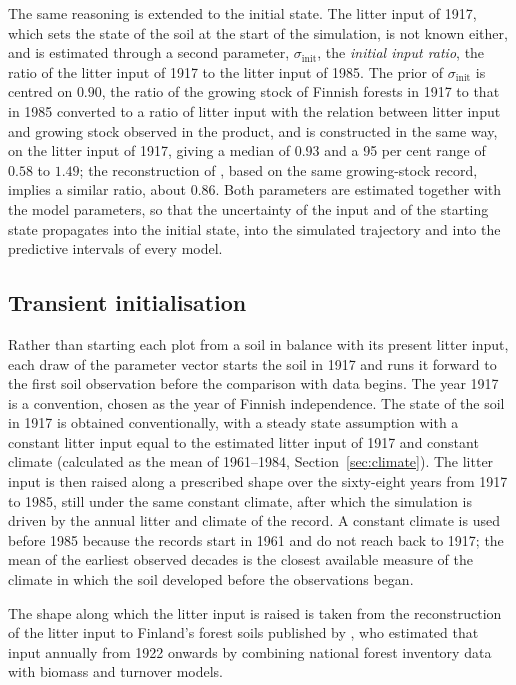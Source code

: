 \documentclass[11pt]{article}
\newcommand{\sinit}{\sigma_{\mathrm{init}}}
\begin{document}
The same reasoning is extended to the initial state. The litter input of 1917, which sets the
state of the soil at the start of the simulation, is not known either, and is estimated
through a second parameter, $\sinit$, the \emph{initial input ratio}, the ratio of the litter
input of 1917 to the litter input of 1985. The prior of $\sinit$ is centred on $0.90$, the ratio of the
growing stock of Finnish forests in 1917 to that in 1985 \citep{Korhonen2024} converted to a
ratio of litter input with the relation between litter input and growing stock observed in the
product, and is constructed in the same way, on the litter input of 1917, giving a median of
$0.93$ and a 95 per cent range of $0.58$ to $1.49$; the reconstruction of \citet{Liski2006}, based on the
same growing-stock record, implies a similar ratio, about $0.86$. Both parameters are estimated
together with the model parameters, so that the uncertainty of the input and of the starting
state propagates into the initial state, into the simulated trajectory and into the predictive
intervals of every model.

\subsection{Transient initialisation}\label{sec:init}

Rather than starting each plot from a soil in balance with its present litter input, each draw
of the parameter vector starts the soil in 1917 and runs it forward to the first soil
observation before the comparison with data begins. The year 1917 is a convention, chosen as
the year of Finnish independence.
The state of the soil in 1917 is obtained conventionally, with a steady state assumption with a
constant litter input equal to the estimated litter input of 1917 and constant climate (calculated as the mean of
1961--1984, Section~\ref{sec:climate}). The litter input is then raised along a prescribed
shape over the sixty-eight years from 1917 to 1985, still under the same constant climate,
after which the simulation is driven by the annual litter and climate of the record. A
constant climate is used before 1985 because the records start in 1961 and do not reach back to 1917; the
mean of the earliest observed decades is the closest available measure of the climate in
which the soil developed before the observations began.

The shape along which the litter input is raised is taken from the reconstruction of the
litter input to Finland's forest soils published by \citet{Liski2006}, who estimated that input
annually from 1922 onwards by combining national forest inventory data with biomass and
turnover models. 
\end{document}
